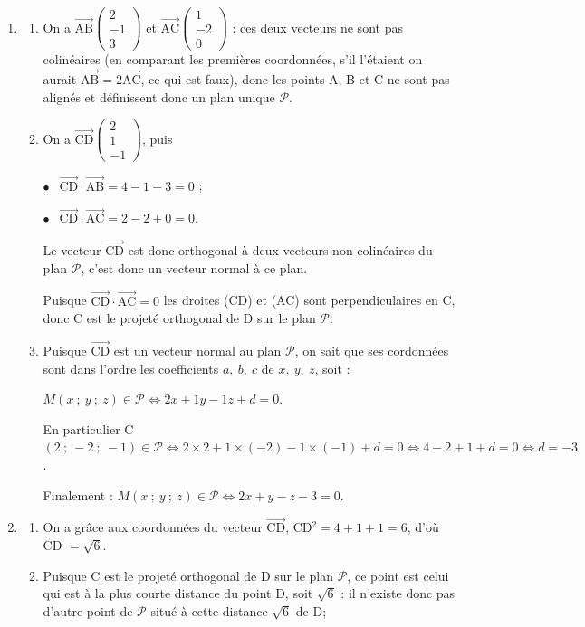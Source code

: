 \documentclass[10pt]{article}
\providecommand{\vect}[1]{\overrightarrow{#1}}
\begin{document}
\begin{enumerate}
\item 
	\begin{enumerate}
		\item 

On a $\vect{\text{AB}}\begin{pmatrix}2\\-1\\3\end{pmatrix}$ et $\vect{\text{AC}}\begin{pmatrix}1\\-2\\0\end{pmatrix}$ : ces deux vecteurs ne sont pas colinéaires (en comparant les premières coordonnées, s'il l'étaient on aurait $\vect{\text{AB}} = 2\vect{\text{AC}}$, ce qui est faux), donc les points A, B et C ne sont pas alignés et définissent donc un plan unique $\mathcal{P}$.
		\item 
On a $\vect{\text{CD}}\begin{pmatrix}2\\1\\-1 \end{pmatrix}$, puis 

$\bullet~~$ $\vect{\text{CD}} \cdot \vect{\text{AB}} = 4 - 1 - 3 = 0$ ;

$\bullet~~$ $\vect{\text{CD}} \cdot \vect{\text{AC}} = 2 - 2 + 0 = 0$.

Le vecteur $\vect{\text{CD}}$ est donc orthogonal à deux vecteurs non colinéaires du plan $\mathcal{P}$, c'est donc un vecteur normal à ce plan.


Puisque $\vect{\text{CD}} \cdot \vect{\text{AC}}  = 0$ les droites (CD) et (AC) sont perpendiculaires en C, donc C est le projeté orthogonal de D sur le plan $\mathcal{P}$.
		\item 
		Puisque $\vect{\text{CD}}$ est un vecteur normal au plan $\mathcal{P}$, on sait que ses cordonnées sont dans l'ordre les coefficients $a, \: b,\:c$ de $x,\:y,\:z$, soit :
		
$M(x~;~y~;~z) \in \mathcal{P} \iff 2x + 1y - 1z + d = 0$.

En particulier C$(2~;~-2~;~ -1) \in \mathcal{P} \iff 2\times 2  + 1\times (- 2)  - 1\times (- 1) + d = 0 \iff 4 - 2 + 1 + d = 0 \iff d = - 3$.

Finalement : $M(x~;~y~;~z) \in \mathcal{P} \iff 2x + y - z - 3 = 0$.
	\end{enumerate}
\item 
	\begin{enumerate}
		\item 
On a grâce aux coordonnées du vecteur $\vect{\text{CD}}$, \:CD$^2 = 4 + 1 + 1 = 6$, d'où CD $ = \sqrt 6$.
		\item 
Puisque C est le projeté orthogonal de D sur le plan $\mathcal{P}$, ce point est celui qui est à la plus courte distance du point D, soit $\sqrt 6$ : il n'existe donc pas d'autre point de $\mathcal{P}$ situé à cette distance $\sqrt 6$ de D;


\end{enumerate}
\end{enumerate}
\end{document}
